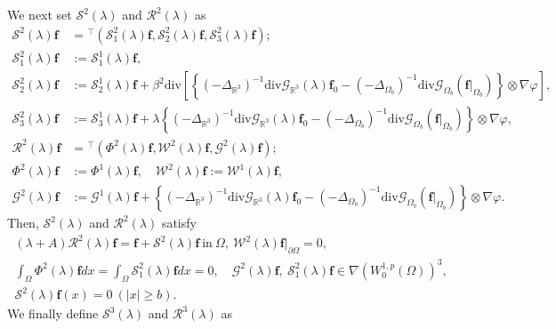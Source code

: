 \documentclass[dvipdfmx,12pt]{article}
\begin{document}
We next set $\mathcal{S}^{2}(\lambda)$ and $\mathcal{R}^2(\lambda)$ as
\begin{align*}
\mathcal{S}^{2}(\lambda)\mathbf{f}&={}^\top(\mathcal{S}_1^{2}(\lambda)\mathbf{f},\mathcal{S}_2^{2}(\lambda)\mathbf{f},\mathcal{S}_3^{2}(\lambda)\mathbf{f}); \\
\mathcal{S}_1^{2}(\lambda)\mathbf{f}&:=\mathcal{S}_1^{1}(\lambda)\mathbf{f},\\
\mathcal{S}_2^{2}(\lambda)\mathbf{f}&:=\mathcal{S}_2^{1}(\lambda)\mathbf{f}+\beta^2\mathrm{div}\left[ \left\{(-\Delta_{\mathbb{R}^3})^{-1}\mathrm{div}\mathcal{G}_{\mathbb{R}^3}(\lambda)\mathbf{f}_0-(-\Delta_{\Omega_b})^{-1}\mathrm{div}\mathcal{G}_{\Omega_{b}}(\mathbf{f}|_{\Omega_{b}})\right\} \otimes\nabla\varphi\right],\\
\mathcal{S}_3^{2}(\lambda)\mathbf{f}&:=\mathcal{S}_3^{1}(\lambda)\mathbf{f}+\lambda\left\{(-\Delta_{\mathbb{R}^3})^{-1}\mathrm{div}\mathcal{G}_{\mathbb{R}^3}(\lambda)\mathbf{f}_0-(-\Delta_{\Omega_b})^{-1}\mathrm{div}\mathcal{G}_{\Omega_{b}}(\mathbf{f}|_{\Omega_{b}})\right\}\otimes\nabla\varphi,\\
\mathcal{R}^{2}(\lambda)\mathbf{f}&={}^\top(\Phi^2(\lambda)\mathbf{f},\mathcal{W}^{2}(\lambda)\mathbf{f},\mathcal{G}^{2}(\lambda)\mathbf{f}); \\
\Phi^2(\lambda)\mathbf{f}&:=\Phi^1(\lambda)\mathbf{f}, \quad
\mathcal{W}^2(\lambda)\mathbf{f}:=\mathcal{W}^{1}(\lambda)\mathbf{f}, \\
\mathcal{G}^2(\lambda)\mathbf{f}&:=\mathcal{G}^{1}(\lambda)\mathbf{f}+ \left\{(-\Delta_{\mathbb{R}^3})^{-1}\mathrm{div}\mathcal{G}_{\mathbb{R}^3}(\lambda)\mathbf{f}_0-(-\Delta_{\Omega_b})^{-1}\mathrm{div}\mathcal{G}_{\Omega_{b}}(\mathbf{f}|_{\Omega_{b}})\right\}\otimes\nabla\varphi.
\end{align*}
Then, $\mathcal{S}^{2}(\lambda)$ and $\mathcal{R}^2(\lambda)$ satisfy
\begin{gather*}
(\lambda+A)\mathcal{R}^2(\lambda)\mathbf{f}=\mathbf{f}+\mathcal{S}^{2}(\lambda)\mathbf{f}~\textrm{in}~\Omega,~\mathcal{W}^2(\lambda)\mathbf{f}|_{\partial \Omega}=0, \\
\int_{\Omega} \Phi^{2}(\lambda)\mathbf{f}dx=\int_{\Omega} \mathcal{S}_1^{2}(\lambda)\mathbf{f}dx=0,\quad \mathcal{G}^{2}(\lambda)\mathbf{f},~
 \mathcal{S}_1^{2}(\lambda)\mathbf{f}\in \nabla (W_0^{1,p}(\Omega))^3, \\
 \mathcal{S}^{2}(\lambda)\mathbf{f}(x)=0~(|x|\ge b).
\end{gather*}
We finally define $\mathcal{S}^{3}(\lambda)$ and $\mathcal{R}^3(\lambda)$ as
\end{document}
